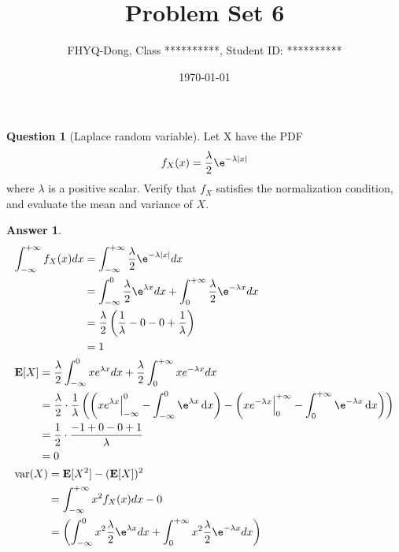 \documentclass[utf8]{article}
\title{Problem Set 6}
\author{ FHYQ-Dong, Class **********, Student ID: ********** }
\date{\today}
\theoremstyle{definition}%
\newtheorem{question}{Question} %
\theoremstyle{plain}%
\newtheorem{answer}{Answer} %
\begin{document}
\maketitle
\thispagestyle{fancy}

\begin{question}[Laplace random variable]
    Let X have the PDF
    \begin{align}
        f_{X}(x) = \frac{\lambda}{2}\e^{-\lambda|x|}
    \end{align}
    where $\lambda$ is a positive scalar. Verify that $f_X$ satisfies the normalization condition, and evaluate the mean and variance of $X$.
\end{question}
\begin{answer}
    \begin{align}
    &\begin{aligned}
        \int_{-\infty}^{+\infty}f_{X}(x)dx &= \int_{-\infty}^{+\infty}\frac{\lambda}{2}\e^{-\lambda|x|}dx \\
        &= \int_{-\infty}^{0}\frac{\lambda}{2}\e^{\lambda x}dx + \int_{0}^{+\infty}\frac{\lambda}{2}\e^{-\lambda x}dx \\
        &= \frac{\lambda}{2}\left(\frac{1}{\lambda} - 0 - 0 + \frac{1}{\lambda}\right) \\
        &= 1
    \end{aligned} \\ 
    &\begin{aligned}
        \mathbf{E}[X] &= \frac{\lambda}{2}\int_{-\infty}^{0}xe^{\lambda x}dx + \frac{\lambda}{2}\int_{0}^{+\infty}xe^{-\lambda x}dx \\
        &= \frac{\lambda}{2}\cdot\frac{1}{\lambda}\left(\left(xe^{\lambda x}\Big|_{-\infty}^{0} - \int_{-\infty}^{0}\e^{\lambda x}\dd{x}\right) - \left(xe^{-\lambda x}\Big|_{0}^{+\infty} - \int_{0}^{+\infty}\e^{-\lambda x}\dd{x}\right)\right) \\ 
        &= \frac{1}{2} \cdot \frac{-1 + 0 - 0 + 1}{\lambda} \\
        &= 0
    \end{aligned} \\ 
    &\begin{aligned}
        \text{var}(X) &= \mathbf{E}[X^2] - (\mathbf{E}[X])^2 \\
        &= \int_{-\infty}^{+\infty}x^2f_{X}(x)dx - 0 \\ 
        &= \left(\int_{-\infty}^{0}x^2\frac{\lambda}{2}\e^{\lambda x}dx + \int_{0}^{+\infty}x^2\frac{\lambda}{2}\e^{-\lambda x}dx\right) \\

\end{aligned}
\end{align}
\end{answer}
\end{document}
